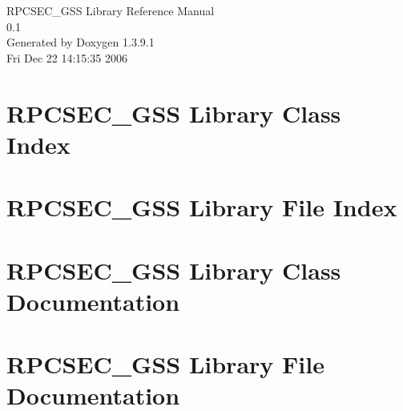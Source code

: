 \documentclass[a4paper]{book}
\begin{document}
\begin{titlepage}
\vspace*{7cm}
\begin{center}
{\Large RPCSEC\_\-GSS Library Reference Manual\\[1ex]\large 0.1 }\\
\vspace*{1cm}
{\large Generated by Doxygen 1.3.9.1}\\
\vspace*{0.5cm}
{\small Fri Dec 22 14:15:35 2006}\\
\end{center}
\end{titlepage}
\clearemptydoublepage
{}
\tableofcontents
\clearemptydoublepage
{}
\chapter{RPCSEC\_\-GSS Library Class Index}

\chapter{RPCSEC\_\-GSS Library File Index}

\chapter{RPCSEC\_\-GSS Library Class Documentation}








\chapter{RPCSEC\_\-GSS Library File Documentation}















































\printindex
\end{document}
